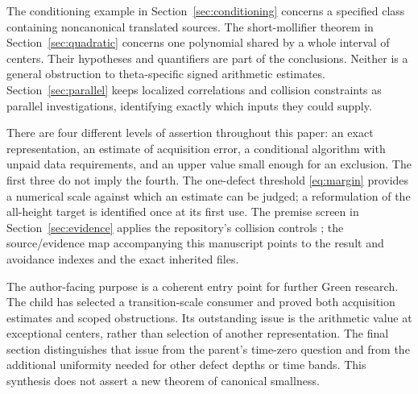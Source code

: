 The conditioning example in Section~\ref{sec:conditioning} concerns a
specified class containing noncanonical translated sources. The
short-mollifier theorem in Section~\ref{sec:quadratic} concerns one
polynomial shared by a whole interval of centers. Their hypotheses and
quantifiers are part of the conclusions. Neither is a general obstruction
to theta-specific signed arithmetic estimates. Section~\ref{sec:parallel}
keeps localized correlations and collision constraints as parallel
investigations, identifying exactly which inputs they could supply.

There are four different levels of assertion throughout this paper:
an exact representation, an estimate of acquisition error, a conditional
algorithm with unpaid data requirements, and an upper value small enough
for an exclusion. The first three do not imply the fourth. The one-defect
threshold \eqref{eq:margin} provides a numerical scale against which an
estimate can be judged; a reformulation of the all-height target is
identified once at its first use. The premise screen in
Section~\ref{sec:evidence} applies the repository's collision controls
\cite{OGControls}; the source/evidence map accompanying this manuscript
points to the result and avoidance indexes and the exact inherited files.

The author-facing purpose is a coherent entry point for further Green
research. The child has selected a transition-scale consumer and proved
both acquisition estimates and scoped obstructions. Its outstanding
issue is the arithmetic value at exceptional centers, rather than
selection of another representation. The final section distinguishes
that issue from the parent's time-zero question and from the additional
uniformity needed for other defect depths or time bands. This synthesis
does not assert a new theorem of canonical smallness.
